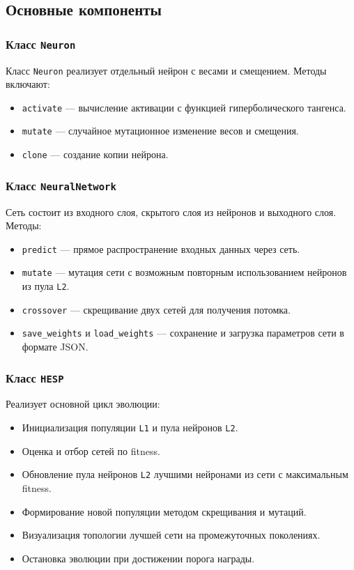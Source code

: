 \documentclass[a4paper,12pt]{article}
\begin{document}
\subsection{Основные компоненты}

\subsubsection{Класс \texttt{Neuron}}

Класс \texttt{Neuron} реализует отдельный нейрон с весами и смещением. Методы включают:

\begin{itemize}
    \item \texttt{activate} --- вычисление активации с функцией гиперболического тангенса.
    \item \texttt{mutate} --- случайное мутационное изменение весов и смещения.
    \item \texttt{clone} --- создание копии нейрона.
\end{itemize}

\subsubsection{Класс \texttt{NeuralNetwork}}

Сеть состоит из входного слоя, скрытого слоя из нейронов и выходного слоя. Методы:

\begin{itemize}
    \item \texttt{predict} --- прямое распространение входных данных через сеть.
    \item \texttt{mutate} --- мутация сети с возможным повторным использованием нейронов из пула \texttt{L2}.
    \item \texttt{crossover} --- скрещивание двух сетей для получения потомка.
    \item \texttt{save\_weights} и \texttt{load\_weights} --- сохранение и загрузка параметров сети в формате JSON.
\end{itemize}

\subsubsection{Класс \texttt{HESP}}

Реализует основной цикл эволюции:

\begin{itemize}
    \item Инициализация популяции \texttt{L1} и пула нейронов \texttt{L2}.
    \item Оценка и отбор сетей по fitness.
    \item Обновление пула нейронов \texttt{L2} лучшими нейронами из сети с максимальным fitness.
    \item Формирование новой популяции методом скрещивания и мутаций.
    \item Визуализация топологии лучшей сети на промежуточных поколениях.
    \item Остановка эволюции при достижении порога награды.
\end{itemize}
\end{document}
